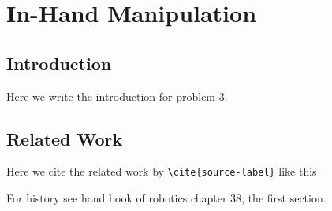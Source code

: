 \chapter{In-Hand Manipulation} \label{ch:3-in-hand-manipulation}

\section{Introduction} \label{sec:3-in-hand-manipulation-introduction}
Here we write the introduction for problem 3.


\section{Related Work} \label{sec:3-in-hand-manipulation-related-work}

Here we cite the related work by \texttt{\textbackslash cite\{source-label\}} like this \cite{recent-progress-in-technologies-for-tactile-sensors}




For history see hand book of robotics chapter 38, the first section.
